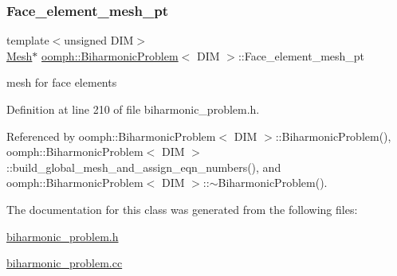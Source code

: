 \subsubsection{\texorpdfstring{Face\+\_\+element\+\_\+mesh\+\_\+pt}{Face\_element\_mesh\_pt}}
{\footnotesize\ttfamily template$<$unsigned D\+IM$>$ \\
\hyperlink{classoomph_1_1Mesh}{Mesh}$\ast$ \hyperlink{classoomph_1_1BiharmonicProblem}{oomph\+::\+Biharmonic\+Problem}$<$ D\+IM $>$\+::Face\+\_\+element\+\_\+mesh\+\_\+pt}



mesh for face elements 



Definition at line 210 of file biharmonic\+\_\+problem.\+h.



Referenced by oomph\+::\+Biharmonic\+Problem$<$ D\+I\+M $>$\+::\+Biharmonic\+Problem(), oomph\+::\+Biharmonic\+Problem$<$ D\+I\+M $>$\+::build\+\_\+global\+\_\+mesh\+\_\+and\+\_\+assign\+\_\+eqn\+\_\+numbers(), and oomph\+::\+Biharmonic\+Problem$<$ D\+I\+M $>$\+::$\sim$\+Biharmonic\+Problem().



The documentation for this class was generated from the following files\+:\begin{DoxyCompactItemize}
\item 
\hyperlink{biharmonic__problem_8h}{biharmonic\+\_\+problem.\+h}\item 
\hyperlink{biharmonic__problem_8cc}{biharmonic\+\_\+problem.\+cc}\end{DoxyCompactItemize}
